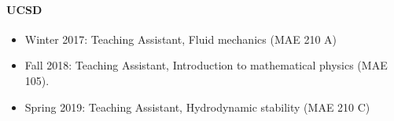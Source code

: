 \documentclass[10pt]{res} %
\begin{document}
\begin{resume}
\paragraph{UCSD} 
\begin{itemize}
	\vspace*{2mm}
	\item Winter 2017: Teaching Assistant, Fluid mechanics (MAE 210 A)
	\item Fall   2018: Teaching Assistant, Introduction to mathematical physics (MAE 105).
	\item Spring 2019: Teaching Assistant, Hydrodynamic stability (MAE 210 C)
\end{itemize}
%
%
%		
%		

\end{resume}
\end{document}
